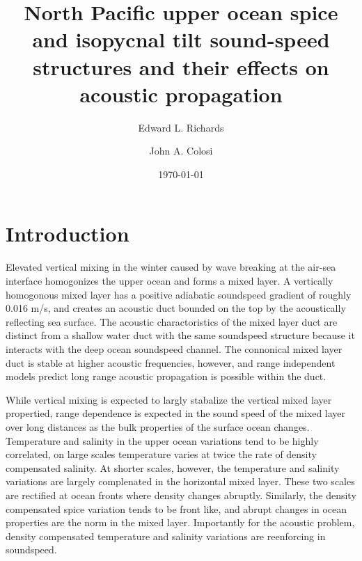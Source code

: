 \documentclass[preprint,NumberedRefs]{JASA}
\begin{document}
\title[Mixed layer tilt and spice]{North Pacific upper ocean spice and isopycnal tilt sound-speed structures and their effects on acoustic propagation}
\author{Edward L. Richards}
\author{John A. Colosi}


\date{\today}


\begin{abstract}

\end{abstract}

\maketitle

\section{\label{sec:intro} Introduction}
Elevated vertical mixing in the winter caused by wave breaking at the air-sea interface homogonizes the upper ocean and forms a mixed layer. A vertically homogonous mixed layer has a positive adiabatic soundspeed gradient of roughly 0.016 m/s, and creates an acoustic duct bounded on the top by the acoustically reflecting sea surface. The acoustic charactoristics of the mixed layer duct are distinct from a shallow water duct with the same soundspeed structure because it interacts with the deep ocean soundspeed channel\citep{porter93}. The connonical mixed layer duct is stable at higher acoustic frequencies, however, and range independent models predict long range acoustic propagation is possible within the duct.


While vertical mixing is expected to largly stabalize the vertical mixed layer propertied, range dependence is expected in the sound speed of the mixed layer over long distances as the bulk properties of the surface ocean changes. Temperature and salinity in the upper ocean variations tend to be highly correlated, on large scales temperature varies at twice the rate of density compensated salinity. At shorter scales, however, the temperature and salinity variations are largely complenated in the horizontal mixed layer. These two scales are rectified at ocean fronts where density changes abruptly. Similarly, the density compensated spice variation tends to be front like, and abrupt changes in ocean properties are the norm in the mixed layer. Importantly for the acoustic problem, density compensated temperature and salinity variations are reenforcing in soundspeed.
\end{document}
